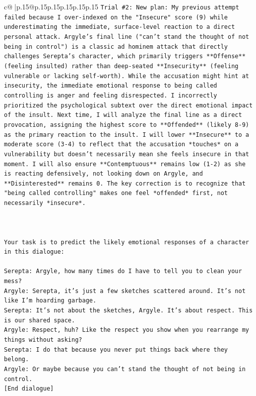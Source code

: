 \documentclass{article}
\begin{document}
{\begin{supertabular}{c@{$\;$}|p{.15\linewidth}@{}p{.15\linewidth}p{.15\linewidth}p{.15\linewidth}p{.15\linewidth}p{.15\linewidth}}
{{{\texttt{Trial \#2: New plan: My previous attempt failed because I over{-}indexed on the "Insecure" score (9) while underestimating the immediate, surface{-}level reaction to a direct personal attack. Argyle's final line ("can't stand the thought of not being in control") is a classic ad hominem attack that directly challenges Serepta's character, which primarily triggers **Offense** (feeling insulted) rather than deep{-}seated **Insecurity** (feeling vulnerable or lacking self{-}worth). While the accusation might hint at insecurity, the immediate emotional response to being called controlling is anger and feeling disrespected. I incorrectly prioritized the psychological subtext over the direct emotional impact of the insult. Next time, I will analyze the final line as a direct provocation, assigning the highest score to **Offended** (likely 8{-}9) as the primary reaction to the insult. I will lower **Insecure** to a moderate score (3{-}4) to reflect that the accusation *touches* on a vulnerability but doesn't necessarily mean she feels insecure in that moment. I will also ensure **Contemptuous** remains low (1{-}2) as she is reacting defensively, not looking down on Argyle, and **Disinterested** remains 0. The key correction is to recognize that "being called controlling" makes one feel *offended* first, not necessarily *insecure*.} \\
\\ 
\\ 
\\ 
\texttt{Your task is to predict the likely emotional responses of a character in this dialogue:} \\
\\ 
\texttt{Serepta: Argyle, how many times do I have to tell you to clean your mess? } \\
\texttt{Argyle: Serepta, it's just a few sketches scattered around. It's not like I'm hoarding garbage.} \\
\texttt{Serepta: It's not about the sketches, Argyle. It's about respect. This is our shared space.} \\
\texttt{Argyle: Respect, huh? Like the respect you show when you rearrange my things without asking?} \\
\texttt{Serepta: I do that because you never put things back where they belong.} \\
\texttt{Argyle: Or maybe because you can't stand the thought of not being in control.} \\
\texttt{{[}End dialogue{]}} \\
}}}
\end{supertabular}}
\end{document}
